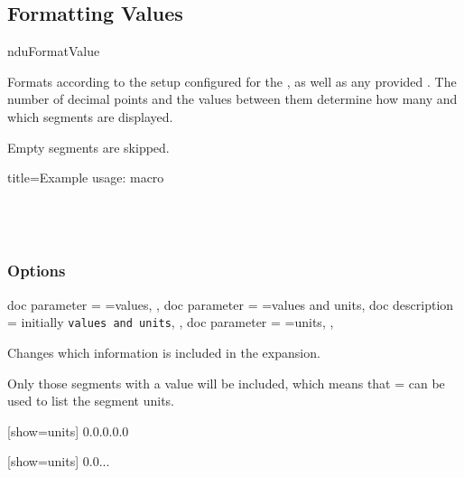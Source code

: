 \documentclass{article}
\begin{document}
\subsection{Formatting Values} %

\begin{docCommand}
	{nduFormatValue}
	{}

Formats  according to the setup configured for the , as well as any provided . The number of decimal points and the values between them determine how many and which segments are displayed.

Empty segments are skipped.
	
\begin{dispExample*}{
	title=Example usage:  macro
}
\\
\\
\\
\\
\end{dispExample*}
\end{docCommand}

\subsubsection{Options}
	
\begin{docKeys}[
		doc name = show,
	]{
		{
			doc parameter = {=values},
		},
		{
			doc parameter = {=values and units},
			doc description = initially \texttt{values and units},
		},
		{
			doc parameter = {=units},
		},
	}

Changes which information is included in the expansion.

Only those segments with a value will be included, which means that = can be used to list the segment units.

\begin{dispExample}
	[show=units]
	{0.0.0.0.0}

	[show=units]
	{0.0...}
\end{dispExample}
\end{docKeys}
\end{document}

